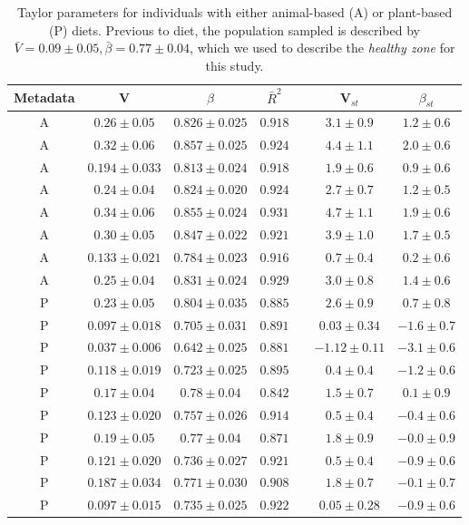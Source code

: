 \begin{table} 
  \begin{center}
    \begin{tabular}{ccccccc}
	    \hline
		Metadata&V&$\beta$&$\bar{R}^2$&&V$_{st}$&$\beta_{st}$\\
		\hline
		A&$0.26 \pm 0.05$&$0.826 \pm 0.025$&$0.918$&&$3.1 \pm 0.9$&$1.2 \pm 0.6$\\
		A&$0.32 \pm 0.06$&$0.857 \pm 0.025$&$0.924$&&$4.4 \pm 1.1$&$2.0 \pm 0.6$\\
		A&$0.194 \pm 0.033$&$0.813 \pm 0.024$&$0.918$&&$1.9 \pm 0.6$&$0.9 \pm 0.6$\\
		A&$0.24 \pm 0.04$&$0.824 \pm 0.020$&$0.924$&&$2.7 \pm 0.7$&$1.2 \pm 0.5$\\
		A&$0.34 \pm 0.06$&$0.855 \pm 0.024$&$0.931$&&$4.7 \pm 1.1$&$1.9 \pm 0.6$\\
		A&$0.30 \pm 0.05$&$0.847 \pm 0.022$&$0.921$&&$3.9 \pm 1.0$&$1.7 \pm 0.5$\\
		A&$0.133 \pm 0.021$&$0.784 \pm 0.023$&$0.916$&&$0.7 \pm 0.4$&$0.2 \pm 0.6$\\
		A&$0.25 \pm 0.04$&$0.831 \pm 0.024$&$0.929$&&$3.0 \pm 0.8$&$1.4 \pm 0.6$\\
		\hline
		P&$0.23 \pm 0.05$&$0.804 \pm 0.035$&$0.885$&&$2.6 \pm 0.9$&$0.7 \pm 0.8$\\
		P&$0.097 \pm 0.018$&$0.705 \pm 0.031$&$0.891$&&$0.03 \pm 0.34$&$-1.6 \pm 0.7$\\
		P&$0.037 \pm 0.006$&$0.642 \pm 0.025$&$0.881$&&$-1.12 \pm 0.11$&$-3.1 \pm 0.6$\\
		P&$0.118 \pm 0.019$&$0.723 \pm 0.025$&$0.895$&&$0.4 \pm 0.4$&$-1.2 \pm 0.6$\\
		P&$0.17 \pm 0.04$&$0.78 \pm 0.04$&$0.842$&&$1.5 \pm 0.7$&$0.1 \pm 0.9$\\
		P&$0.123 \pm 0.020$&$0.757 \pm 0.026$&$0.914$&&$0.5 \pm 0.4$&$-0.4 \pm 0.6$\\
		P&$0.19 \pm 0.05$&$0.77 \pm 0.04$&$0.871$&&$1.8 \pm 0.9$&$-0.0 \pm 0.9$\\
		P&$0.121 \pm 0.020$&$0.736 \pm 0.027$&$0.921$&&$0.5 \pm 0.4$&$-0.9 \pm 0.6$\\
		P&$0.187 \pm 0.034$&$0.771 \pm 0.030$&$0.908$&&$1.8 \pm 0.7$&$-0.1 \pm 0.7$\\
		P&$0.097 \pm 0.015$&$0.735 \pm 0.025$&$0.922$&&$0.05 \pm 0.28$&$-0.9 \pm 0.6$\\
	   \hline
	   \hline
    \end{tabular}
  \end{center}
  \caption{Taylor parameters for individuals with either animal-based (A) or plant-based (P) diets\cite{diet}. Previous to diet, the population sampled is described by $\bar{V} = 0.09 \pm 0.05, \bar{\beta} = 0.77 \pm 0.04$, which we used to describe the \emph{healthy zone} for this study.}
  \label{tab:diet}
\end{table}

